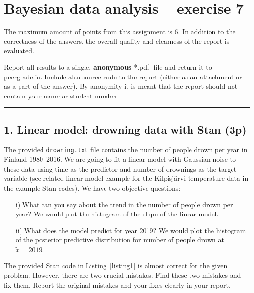 \documentclass[a4paper,11pt]{article}
\newcommand{\HRule}{\rule{\linewidth}{0.5mm}}
\begin{document}

\section*{Bayesian data analysis -- exercise 7}


The maximum amount of points from this assignment is 6. In addition to the correctness of the answers, the overall quality and clearness of the report is evaluated.

Report all results to a single, {\bf anonymous} *.pdf -file and return it to \href{peergrade.io}{peergrade.io}. Include also source code to the report (either as an attachment or as a part of the answer). By anonymity it is meant that the report should not contain your name or student number.

\HRule

\vspace{1cm}


\subsection*{1. Linear model: drowning data with Stan (3p)}

The provided {\tt drowning.txt} file contains the number of people drown per year in Finland 1980--2016.
We are going to fit a linear model with Gaussian noise to these data using time as the predictor and number of drownings as the target variable (see related linear model example for the Kilpisjärvi-temperature data in the example Stan codes).
We have two objective questions:
\begin{itemize}
	\item [i)] What can you say about the trend in the number of people drown per year? We would plot the histogram of the slope of the linear model.
	\item [ii)] What does the model predict for year 2019? We would plot the histogram of the posterior predictive distribution for number of people drown at $\tilde x=2019$.
\end{itemize}

The provided Stan code in Listing~\ref{listing1} is almost correct for the given problem. However, there are two crucial mistakes. Find these two mistakes and fix them. Report the original mistakes and your fixes clearly in your report.
\end{document}
